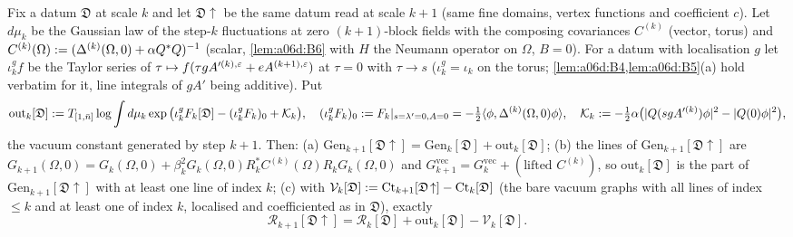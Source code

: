 \begin{lemma}\label{lem:a06d:V6}
Fix a datum $\mathfrak D$ at scale $k$ and let $\mathfrak D\!\uparrow$ be the same datum read at scale $k+1$ (same fine domains, vertex functions and coefficient $c$). Let $d\mu_k$ be the Gaussian law of the step-$k$ fluctuations at zero $(k+1)$-block fields with the composing covariances $C^{(k)}$ (vector, torus) and $C^{(k)}(\Omega):=(\Delta^{(k)}(\Omega,0)+\alpha Q^*Q)^{-1}$ (scalar, \cref{lem:a06d:B6} with $H$ the Neumann operator on $\Omega$, $B=0$). For a datum with localisation $g$ let $\iota^g_kf$ be the Taylor series of $\tau\mapsto f(\tau gA'^{(k),\varepsilon}+eA^{(k+1),\varepsilon})$ at $\tau=0$ with $\tau\to s$ ($\iota^g_k=\iota_k$ on the torus; \cref{lem:a06d:B4,lem:a06d:B5}(a) hold verbatim for it, line integrals of $gA'$ being additive). Put
\[
\mathrm{out}_k[\mathfrak D]:= T_{[1,\bar n]}\log\int d\mu_k\exp\big(\iota^g_kF_k[\mathfrak D]-(\iota^g_kF_k)_0+\mathcal K_k\big),\quad(\iota^g_kF_k)_0:= F_k|_{s=\lambda'=0,A=0}=-\tfrac12\langle\phi,\Delta^{(k)}(\Omega,0)\phi\rangle,\quad\mathcal K_k:=-\tfrac12\alpha\big(|Q(sgA'^{(k)})\phi|^2-|Q(0)\phi|^2\big),
\]
the vacuum constant generated by step $k+1$. Then: \textup{(a)} $\mathrm{Gen}_{k+1}[\mathfrak D\!\uparrow]=\mathrm{Gen}_k[\mathfrak D]+\mathrm{out}_k[\mathfrak D]$; \textup{(b)} the lines of $\mathrm{Gen}_{k+1}[\mathfrak D\!\uparrow]$ are $G_{k+1}(\Omega,0)=G_k(\Omega,0)+\beta_k^2G_k(\Omega,0)R_k^*C^{(k)}(\Omega)R_kG_k(\Omega,0)$ and $G^{\mathrm{vec}}_{k+1}=G^{\mathrm{vec}}_k+(\text{lifted }C^{(k)})$, so $\mathrm{out}_k[\mathfrak D]$ is the part of $\mathrm{Gen}_{k+1}[\mathfrak D\!\uparrow]$ with at least one line of index $k$; \textup{(c)} with $\mathcal V_k[\mathfrak D]:=\mathrm{Ct}_{k+1}[\mathfrak D\!\uparrow]-\mathrm{Ct}_k[\mathfrak D]$ (the bare vacuum graphs with all lines of index $\le k$ and at least one of index $k$, localised and coefficiented as in $\mathfrak D$), exactly
\[
\mathcal R_{k+1}[\mathfrak D\!\uparrow]=\mathcal R_k[\mathfrak D]+\mathrm{out}_k[\mathfrak D]-\mathcal V_k[\mathfrak D].
\]
\end{lemma}


